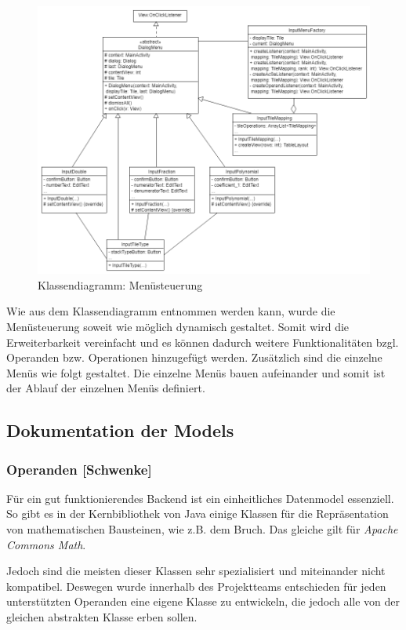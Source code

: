 \begin{figure}[h]
	\includegraphics[width=\columnwidth]{img/klassendiagramm_Menusteuerung}
	\caption[Klassendiagramm: Menüsteuerung]{Klassendiagramm: Menüsteuerung\footnotemark}
\end{figure}

Wie aus dem Klassendiagramm entnommen werden kann, wurde die Menüsteuerung soweit wie möglich dynamisch gestaltet. Somit wird die Erweiterbarkeit vereinfacht und es können dadurch weitere Funktionalitäten bzgl. Operanden bzw. Operationen hinzugefügt werden. Zusätzlich sind die einzelne Menüs wie folgt gestaltet. Die einzelne Menüs bauen aufeinander und somit ist der Ablauf der einzelnen Menüs definiert. 
\clearpage

\subsection{Dokumentation der Models }

\subsubsection{Operanden [Schwenke]}

Für ein gut funktionierendes Backend ist ein einheitliches Datenmodel essenziell. So gibt es in der Kernbibliothek von Java einige Klassen für die Repräsentation von mathematischen Bausteinen, wie z.B. dem Bruch. Das gleiche gilt für \textit{Apache Commons Math}. 

Jedoch sind die meisten dieser Klassen sehr spezialisiert und miteinander nicht kompatibel. Deswegen wurde innerhalb des Projektteams entschieden für jeden unterstützten Operanden eine eigene Klasse zu entwickeln, die jedoch alle von der gleichen abstrakten Klasse  erben sollen. 

